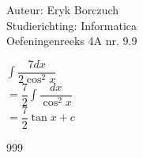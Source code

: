 \documentclass[a4paper]{article}
\begin{document}
  
\noindent \large Auteur: Eryk Borczuch \\
\noindent \large Studierichting: Informatica\\
\noindent \large Oefeningenreeks 4A nr. 9.9\\

\medskip

\normalsize


$\displaystyle\int \dfrac{7dx}{2\cos^2x} $\\

$= \dfrac{7}{2} \displaystyle\int \dfrac{dx}{\cos^2x}$\\

$= \dfrac{7}{2} \tan x +c $\\


\begin{thebibliography}{999}
\end{thebibliography}
\end{document}
